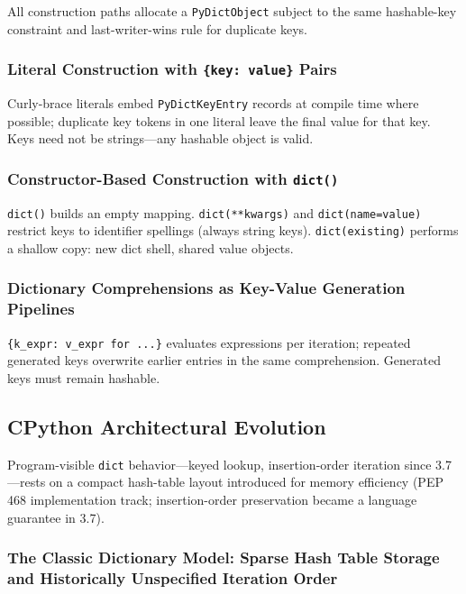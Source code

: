 \documentclass[a4paper,twoside]{report}
\begin{document}
All construction paths allocate a \texttt{PyDictObject} subject to the same hashable-key constraint and last-writer-wins rule for duplicate keys.

\subsubsection{Literal Construction with \texttt{\{key: value\}} Pairs}

Curly-brace literals embed \texttt{PyDictKeyEntry} records at compile time where possible; duplicate key tokens in one literal leave the final value for that key. Keys need not be strings---any hashable object is valid.

\subsubsection{Constructor-Based Construction with \texttt{dict()}}

\texttt{dict()} builds an empty mapping. \texttt{dict(**kwargs)} and \texttt{dict(name=value)} restrict keys to identifier spellings (always string keys). \texttt{dict(existing)} performs a shallow copy: new dict shell, shared value objects.

\subsubsection{Dictionary Comprehensions as Key-Value Generation Pipelines}

\texttt{\{k\_expr: v\_expr for ...\}} evaluates expressions per iteration; repeated generated keys overwrite earlier entries in the same comprehension. Generated keys must remain hashable.


\subsection{CPython Architectural Evolution}

Program-visible \texttt{dict} behavior---keyed lookup, insertion-order iteration since 3.7---rests on a compact hash-table layout introduced for memory efficiency (PEP 468 implementation track; insertion-order preservation became a language guarantee in 3.7).

\subsubsection{The Classic Dictionary Model: Sparse Hash Table Storage and Historically Unspecified Iteration Order}
\end{document}
